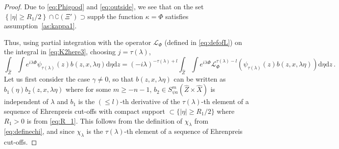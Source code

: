 \documentclass[
	fontsize=11pt, 
	twoside=false, 
	abstract=true, 
	a4paper,
]{scrartcl}
\newcommand{\dd}{\mathrm{d}}
\newcommand{\abs}[1]{\left\lvert#1\right\rvert}
\newcommand{\supp}{\mathrm{supp}}
\begin{document}
\begin{proof}
	Due to \cref{eq:Phigood} and \cref{eq:outside}, we see that on the set $\left\{\abs{\eta}\geq R_1/2\right\}\cap \complement(\Xi')\supset \supp b$ the function $\kappa = \Phi$ satisfies assumption~\ref{as:kappa1}. %

	Thus, using partial integration with the operator $\mathcal{L}_\Phi$ (defined in \cref{eq:defofL}) on the integral in \cref{eq:K2here3}, choosing $j=\tau(\lambda)$,
	\[
		\int_{\hat Z}\int e^{i\lambda\Phi} \psi_{\tau(\lambda)}(z)b(z,x,\lambda\eta)\dd\eta\dd z = (-i\lambda)^{-\tau(\lambda)+l} \int_{\hat Z}\int e^{i\lambda\Phi} \mathcal{L}_\Phi^{\tau(\lambda)-l} \left(\psi_{\tau(\lambda)}(z)b(z,x,\lambda\eta)\right)\dd\eta \dd z\,.
	\]
	Let us first consider the case $\gamma \neq 0$, so that $b(z,x,\lambda\eta)$ can be written as $b_1(\eta) b_2(z,x,\lambda\eta)$ where for some $m\geq -n-1$, $b_2 \in S^{m}_{\psi a}(\hat Z\times \hat X)$ is independent of $\lambda$ and $b_1$ is the $(\leq l)$-th derivative of the $\tau(\lambda)$-th element of a sequence of Ehrenpreis cut-offs with compact support $\subset \{\abs{\eta}\geq R_1/2\}$ where $R_1>0$ is from \cref{eq:R_1}. This follows from the definition of $\chi_\lambda$ from \cref{eq:definechi}, and since $\chi_\lambda$ is the $\tau(\lambda)$-th element of a sequence of Ehrenpreis cut-offs.


\end{proof}
\end{document}
